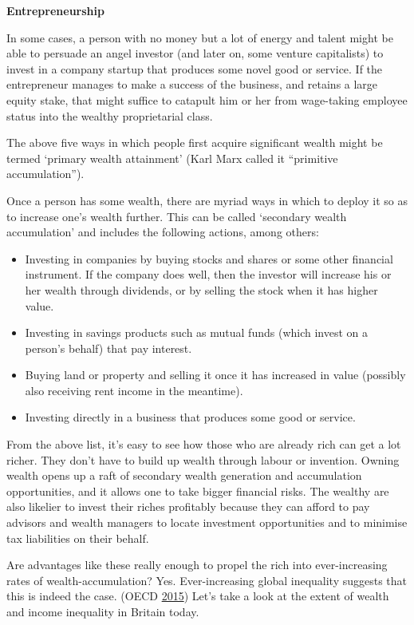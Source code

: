 \documentclass[]{tufte-handout}
\providecommand{\tightlist}{%
  \setlength{\itemsep}{0pt}\setlength{\parskip}{0pt}}
\begin{document}
\textbf{Entrepreneurship}

In some cases, a person with no money but a lot of energy and talent
might be able to persuade an angel investor (and later on, some venture
capitalists) to invest in a company startup that produces some novel
good or service. If the entrepreneur manages to make a success of the
business, and retains a large equity stake, that might suffice to
catapult him or her from wage-taking employee status into the wealthy
proprietarial class.

The above five ways in which people first acquire significant wealth
might be termed `primary wealth attainment' (Karl Marx called it
``primitive accumulation'').

Once a person has some wealth, there are myriad ways in which to deploy
it so as to increase one's wealth further. This can be called `secondary
wealth accumulation' and includes the following actions, among others:

\begin{itemize}
\tightlist
\item
  Investing in companies by buying stocks and shares or some other
  financial instrument. If the company does well, then the investor will
  increase his or her wealth through dividends, or by selling the stock
  when it has higher value.
\item
  Investing in savings products such as mutual funds (which invest on a
  person's behalf) that pay interest.
\item
  Buying land or property and selling it once it has increased in value
  (possibly also receiving rent income in the meantime).
\item
  Investing directly in a business that produces some good or service.
\end{itemize}

From the above list, it's easy to see how those who are already rich can
get a lot richer. They don't have to build up wealth through labour or
invention. Owning wealth opens up a raft of secondary wealth generation
and accumulation opportunities, and it allows one to take bigger
financial risks. The wealthy are also likelier to invest their riches
profitably because they can afford to pay advisors and wealth managers
to locate investment opportunities and to minimise tax liabilities on
their behalf.

Are advantages like these really enough to propel the rich into
ever-increasing rates of wealth-accumulation? Yes. Ever-increasing
global inequality suggests that this is indeed the case. (OECD
\protect\hyperlink{ref-OECD2015}{2015}) Let's take a look at the extent
of wealth and income inequality in Britain today.
\end{document}
